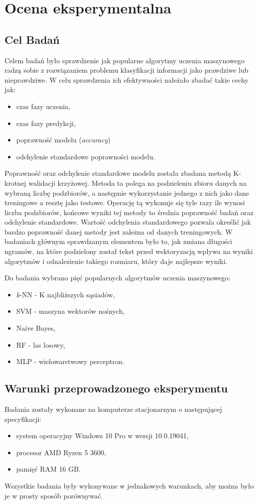 \chapter{Ocena eksperymentalna}
\section{Cel Badań}
Celem badań było sprawdzenie jak popularne algorytmy uczenia maszynowego radzą sobie z rozwiązaniem problemu 
klasyfikacji informacji jako prawdziwe lub nieprawdziwe. W celu sprawdzenia ich efektywności należało zbadać
takie cechy jak:
\begin{itemize}
    \item czas fazy uczenia,
    \item czas fazy predykcji,
    \item poprawność modelu (\textit{accuracy})
    \item odchylenie standardowe poprawności modelu.
\end{itemize}
Poprawność oraz odchylenie standardowe modelu została zbadana metodą K-krotnej walidacji krzyżowej. 
Metoda ta polega na podzieleniu zbioru danych na wybraną liczbę podzbiorów, a następnie wykorzystanie jednego
z nich jako dane treningowe a resztę jako testowe. Operację tą wykonuje się tyle razy ile wynosi liczba podzbiorów,
końcowe wyniki tej metody to średnia poprawność badań oraz odchylenie standardowe. Wartość odchylenia standardowego
pozwala określić jak bardzo poprawność danej metody jest zależna od danych treningowych. 
W badaniach głównym sprawdzanym elementem było to, jak zmiana długości ngramów, na które podzielony
został tekst przed wektoryzacją wpływa na wyniki algorytmów i odnalezienie takiego rozmiaru, który
daje najlepsze wyniki. 

Do badania wybrano pięć popularnych algorytmów uczenia maszynowego: 
\begin{itemize}
    \item \textit{k}-NN - K najbliższych sąsiadów,
    \item SVM - maszyna wektorów nośnych,
    \item Naive Bayes,
    \item RF - las losowy,
    \item MLP - wielowarstwowy perceptron.
\end{itemize} 
\section{Warunki przeprowadzonego eksperymentu}
Badania zostały wykonane na komputerze stacjonarnym o następującej specyfikacji:
\begin{itemize}
    \item system operacyjny Windows 10 Pro w wersji 10.0.19041,
    \item procesor AMD Ryzen 5 3600,
    \item pamięć RAM 16 GB.
\end{itemize}
Wszystkie badania były wykonywane w jednakowych warunkach, aby można było 
je w prosty sposób porównywać. 

